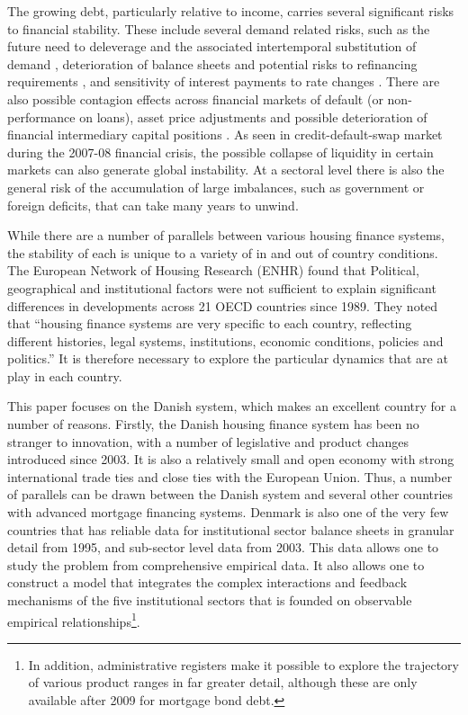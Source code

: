 \documentclass[
]{book}
\begin{document}
The growing debt, particularly relative to income, carries several significant risks to financial stability. These include several demand related risks, such as the future need to deleverage and the associated intertemporal substitution of demand \citep{Justiniano2015, Raberto2012, Seppecher2015}, deterioration of balance sheets and potential risks to refinancing requirements \citep{bernanke2007, scanlon2008, disyatat2011}, and sensitivity of interest payments to rate changes \citep{sheehy2014}. There are also possible contagion effects across financial markets of default (or non-performance on loans), asset price adjustments and possible deterioration of financial intermediary capital positions \citep{DanmarksNationalbank2016a}. As seen in credit-default-swap market during the 2007-08 financial crisis, the possible collapse of liquidity in certain markets can also generate global instability. At a sectoral level there is also the general risk of the accumulation of large imbalances, such as government or foreign deficits, that can take many years to unwind.

While there are a number of parallels between various housing finance systems, the stability of each is unique to a variety of in and out of country conditions. The European Network of Housing Research (ENHR) \citep{lunde2014introduction} found that Political, geographical and institutional factors were not sufficient to explain significant differences in developments across 21 OECD countries since 1989. They \citep[pp.~4]{lunde2014introduction} noted that ``housing finance systems are very specific to each country, reflecting different histories, legal systems, institutions, economic conditions, policies and politics.'' It is therefore necessary to explore the particular dynamics that are at play in each country.

This paper focuses on the Danish system, which makes an excellent country for a number of reasons. Firstly, the Danish housing finance system has been no stranger to innovation, with a number of legislative and product changes introduced since 2003. It is also a relatively small and open economy with strong international trade ties and close ties with the European Union. Thus, a number of parallels can be drawn between the Danish system and several other countries with advanced mortgage financing systems. Denmark is also one of the very few countries that has reliable data for institutional sector balance sheets in granular detail from 1995, and sub-sector level data from 2003. This data allows one to study the problem from comprehensive empirical data. It also allows one to construct a model that integrates the complex interactions and feedback mechanisms of the five institutional sectors that is founded on observable empirical relationships\footnote{In addition, administrative registers make it possible to explore the trajectory of various product ranges in far greater detail, although these are only available after 2009 for mortgage bond debt.}.
\end{document}
